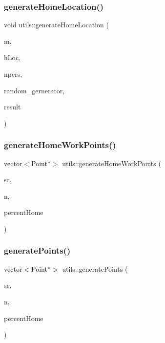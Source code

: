 \mbox{\label{namespaceutils_ab4bf690ba2e57ea5479693d934e6a1a3}} 
\subsubsection{\texorpdfstring{generate\+Home\+Location()}{generateHomeLocation()}}
{\footnotesize\ttfamily void utils\+::generate\+Home\+Location (\begin{DoxyParamCaption}\item[{\hyperlink{class_map}{Map} $\ast$}]{m,  }\item[{\hyperlink{class_home_work_location}{Home\+Work\+Location}}]{h\+Loc,  }\item[{unsigned int}]{npers,  }\item[{\hyperlink{class_random_number_generator}{Random\+Number\+Generator} $\ast$}]{random\+\_\+gernerator,  }\item[{vector$<$ Point $\ast$$>$ \&}]{result }\end{DoxyParamCaption})}

\mbox{\label{namespaceutils_a60674386468ac1970ec834927a90e6a0}} 
\subsubsection{\texorpdfstring{generate\+Home\+Work\+Points()}{generateHomeWorkPoints()}}
{\footnotesize\ttfamily vector$<$Point$\ast$$>$ utils\+::generate\+Home\+Work\+Points (\begin{DoxyParamCaption}\item[{\hyperlink{class_simulation_configuration}{Simulation\+Configuration} $\ast$}]{sc,  }\item[{unsigned long}]{n,  }\item[{double}]{percent\+Home }\end{DoxyParamCaption})}

\mbox{\label{namespaceutils_a48a29442f25828b253a68ec62dde4ef8}} 
\subsubsection{\texorpdfstring{generate\+Points()}{generatePoints()}}
{\footnotesize\ttfamily vector$<$Point$\ast$$>$ utils\+::generate\+Points (\begin{DoxyParamCaption}\item[{\hyperlink{class_simulation_configuration}{Simulation\+Configuration} $\ast$}]{sc,  }\item[{unsigned long}]{n,  }\item[{double}]{percent\+Home }\end{DoxyParamCaption})}


